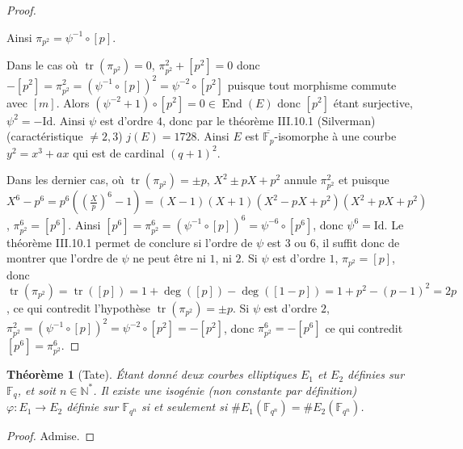 \documentclass{article}
\theoremstyle{plain}%
\newtheorem{thm}{Théorème}[section]
\theoremstyle{definition}%
\newcommand{\F}{\mathbb{F}}
\newcommand{\N}{\mathbb{N}}
\DeclareMathOperator{\End}{End}
\DeclareMathOperator{\tr}{tr}
\begin{document}
\begin{proof}
\begin{center}
\end{center}
Ainsi $\pi_{p^2} = \psi^{-1} \circ [p]$.

\vspace{1em}
Dans le cas où $\tr(\pi_{p^2}) = 0$, $\pi_{p^2}^2 + [p^2] = 0$ donc $-[p^2] = \pi_{p^2}^2 = (\psi^{-1} \circ [p])^2 = \psi^{-2} \circ [p^2]$ puisque tout morphisme commute avec $[m]$. Alors $(\psi^{-2} +1)\circ [p^2] = 0\in \End(E)$ donc $[p^2]$ étant surjective, $\psi^2 = -\text{Id}$.
Ainsi $\psi$ est d'ordre $4$, donc par le théorème III.10.1 (Silverman) (caractéristique $\neq 2, 3$) $j(E) = 1728$.
Ainsi $E$ est $\overline{\F_p}$-isomorphe à une courbe $y^2=x^3 + ax$ qui est de cardinal $(q+1)^2$.

\vspace{1em}
Dans les dernier cas, où $\tr(\pi_{p^2}) = \pm p$, $X^2 \pm p X +p^2$ annule $\pi_{p^2}^2$ et puisque $X^6 - p^6 = p^6 ((\frac{X}{p})^6 - 1) = (X-1)(X+1)(X^2 -pX + p^2)(X^2 + pX + p^2)$, $\pi_{p^2}^6 = [p^6]$. Ainsi $[p^6] = \pi_{p^2}^6  = (\psi^{-1} \circ [p])^6 = \psi^{-6} \circ [p^6]$, donc $\psi^6 = \text{Id}$. Le théorème III.10.1 permet de conclure si l'ordre de $\psi$ est $3$ ou $6$, il suffit donc de montrer que l'ordre de $\psi$ ne peut être ni $1$, ni $2$.
Si $\psi$ est d'ordre $1$, $\pi_{p^2} = [p]$, donc $\tr(\pi_{p^2}) = \tr([p]) = 1 + \deg([p]) - \deg([1-p]) = 1 + p^2 -(p-1)^2 = 2p$, ce qui contredit l'hypothèse $\tr(\pi_{p^2}) = \pm p$. 
Si $\psi$ est d'ordre $2$, $\pi_{p^2}^2 = (\psi^{-1} \circ [p])^2 = \psi^{-2} \circ [p^2] = - [p^2]$, donc $\pi_{p^2}^6 = -[p^6]$ ce qui contredit $[p^6] = \pi_{p^2}^6$. 
\end{proof}

\begin{thm}[Tate]
  \label{tate}
Étant donné deux courbes elliptiques $E_1$ et $E_2$ définies sur $\F_{q}$, et soit $n\in\N^*$. Il existe une isogénie (non constante par définition) $\varphi : E_1 \to E_2$ définie sur $\F_{q^n}$ si et seulement si $\# E_1(\F_{q^n}) = \# E_2(\F_{q^n})$. 
\end{thm}

\begin{proof}
  Admise.
\end{proof}
\end{document}
